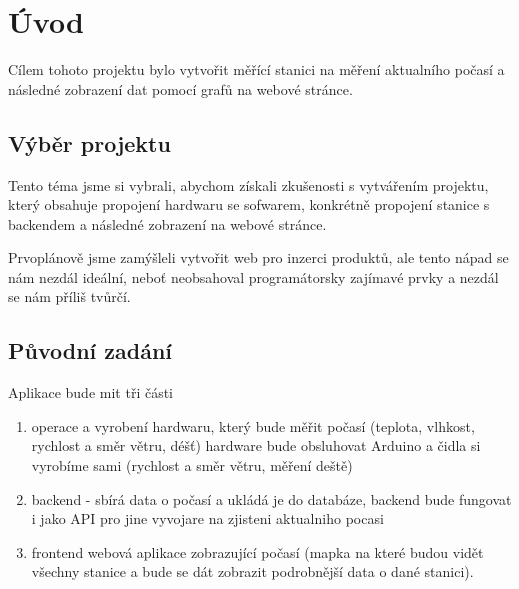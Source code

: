 \section{Úvod}
Cílem tohoto projektu bylo vytvořit měřící stanici na měření aktualního počasí a následné zobrazení dat pomocí grafů na webové stránce.

\subsection{Výběr projektu}
Tento téma jsme si vybrali, abychom získali zkušenosti s vytvářením projektu, 
který obsahuje propojení hardwaru se sofwarem, konkrétně propojení stanice s backendem a následné zobrazení na webové stránce. 

Prvoplánově jsme zamýšleli vytvořit web pro inzerci produktů,
ale tento nápad se nám nezdál ideální, neboť neobsahoval programátorsky zajímavé prvky a nezdál se nám příliš tvůrčí.

\subsection{Původní zadání}
Aplikace bude mit tři části
\begin{enumerate}
    \item operace a vyrobení hardwaru, který bude měřit počasí (teplota, vlhkost, rychlost a směr větru, déšť) hardware bude obsluhovat Arduino a čidla si vyrobíme sami (rychlost a směr větru, měření deště)
    \item backend - sbírá data o počasí a ukládá je do databáze, backend bude fungovat i jako API pro jine vyvojare na zjisteni aktualniho pocasi
    \item frontend webová aplikace zobrazující počasí (mapka na které budou vidět všechny stanice a bude se dát zobrazit podrobnější data o dané stanici).
\end{enumerate}